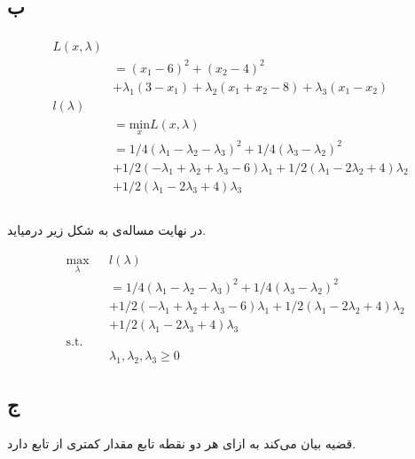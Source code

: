 \documentclass[paper=a4, fontsize=11pt]{article}
\numberwithin{equation}{section} %
\numberwithin{figure}{section} %
\numberwithin{table}{section} %
\begin{document}
\subsection{ب}
\begin{align}
	\begin{split}
		L(x, \lambda)\\
		&= (x_1 - 6)^2 + (x_2 - 4)^2\\
		&+ \lambda_1 (3 - x_1) + \lambda_2 (x_1 + x_2 - 8) + \lambda_3 (x_1 - x_2)\\
		l(\lambda)\\
		&= \underset{x}{\text{min}}L(x, \lambda)\\
		&= 1/4(\lambda_1-\lambda_2-\lambda_3)^2 + 1/4(\lambda_3-\lambda_2)^2 \\
		&+ 1/2(-\lambda_1+\lambda_2+\lambda_3-6)\lambda_1 + 1/2(\lambda_1-2\lambda_2+4)\lambda_2 \\
		&+ 1/2(\lambda_1-2\lambda_3+4)\lambda_3 \\
	\end{split}
\end{align}
\paragraph{}
در نهایت مساله‌ی  به شکل زیر درمیاید.

\begin{equation}
	\begin{aligned}
		& \underset{\lambda}{\text{max}}
		& & l(\lambda) \\
		& & &= 1/4(\lambda_1-\lambda_2-\lambda_3)^2 + 1/4(\lambda_3-\lambda_2)^2 \\
		& & &+ 1/2(-\lambda_1+\lambda_2+\lambda_3-6)\lambda_1 + 1/2(\lambda_1-2\lambda_2+4)\lambda_2 \\
		& & &+ 1/2(\lambda_1-2\lambda_3+4)\lambda_3 \\
		& \text{s.t.} \\
		& & & \lambda_1, \lambda_2, \lambda_3 \ge 0
	\end{aligned}
\end{equation}

\subsection{ج}
\paragraph{}
قضیه  بیان می‌کند به ازای هر دو نقطه تابع  مقدار کمتری از تابع  دارد.
\end{document}
